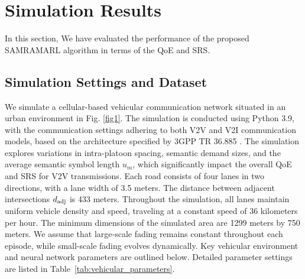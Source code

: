 \documentclass[10pt, lettersize,journal]{IEEEtran}
\begin{document}
	\section{Simulation Results}
	In this section, We have evaluated the performance of the proposed SAMRAMARL algorithm in terms of the QoE and SRS.
	\subsection{Simulation Settings and Dataset}
	We simulate a cellular-based vehicular communication network situated in an urban environment in Fig. \ref{fig1}. The simulation is conducted using Python 3.9, with the communication settings adhering to both V2V and V2I communication models, based on the architecture specified by 3GPP TR 36.885 \cite{RN90}. The simulation explores variations in intra-platoon spacing, semantic demand sizes, and the average semantic symbol length ${u_m}$, which significantly impact the overall QoE and SRS for V2V transmissions.
	Each road consists of four lanes in two directions, with a lane width of 3.5 meters. The distance between adjacent intersections ${d_{{\rm{adj}}}}$ is 433 meters. 
	Throughout the simulation, all lanes maintain uniform vehicle density and speed, traveling at a constant speed of 36 kilometers per hour. 
	The minimum dimensions of the simulated area are 1299 meters by 750 meters.
	We assume that large-scale fading remains constant throughout each episode, while small-scale fading evolves dynamically. Key vehicular environment and neural network parameters are outlined below. Detailed parameter settings are listed in Table~\ref{tab:vehicular_parameters}.
\end{document}
